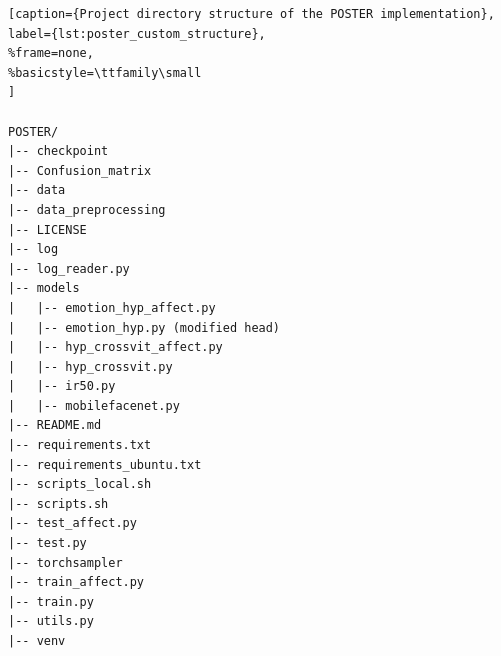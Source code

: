 \begin{lstlisting}[caption={Project directory structure of the POSTER implementation}, label={lst:poster_custom_structure},
%frame=none,
%basicstyle=\ttfamily\small
]

POSTER/
|-- checkpoint
|-- Confusion_matrix
|-- data
|-- data_preprocessing
|-- LICENSE
|-- log
|-- log_reader.py
|-- models
| 	|-- emotion_hyp_affect.py
|	|-- emotion_hyp.py (modified head)
|	|-- hyp_crossvit_affect.py
|	|-- hyp_crossvit.py
|	|-- ir50.py
|	|-- mobilefacenet.py
|-- README.md
|-- requirements.txt
|-- requirements_ubuntu.txt
|-- scripts_local.sh
|-- scripts.sh
|-- test_affect.py
|-- test.py
|-- torchsampler
|-- train_affect.py
|-- train.py
|-- utils.py
|-- venv
\end{lstlisting}











